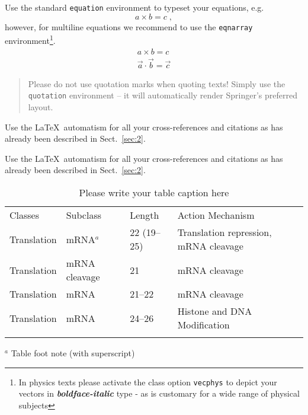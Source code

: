 \documentclass[graybox]{svmult}
\begin{document}
\newpage



Use the standard \verb|equation| environment to typeset your equations, e.g.
%
\begin{equation}
a \times b = c\;,
\end{equation}
%
however, for multiline equations we recommend to use the \verb|eqnarray| environment\footnote{In physics texts please activate the class option \texttt{vecphys} to depict your vectors in \textbf{\itshape boldface-italic} type - as is customary for a wide range of physical subjects}.
\begin{eqnarray}
a \times b = c \nonumber\\
\vec{a} \cdot \vec{b}=\vec{c}
\label{eq:01}
\end{eqnarray}


\begin{quotation}
Please do not use quotation marks when quoting texts! Simply use the \verb|quotation| environment -- it will automatically render Springer's preferred layout.
\end{quotation}









 Use the \LaTeX\ automatism for all your cross-references and citations as has already been described in Sect.~\ref{sec:2}.

 Use the \LaTeX\ automatism for all your cross-refer\-ences and citations as has already been described in Sect.~\ref{sec:2}.
%
%
\begin{table}
\caption{Please write your table caption here}
\label{tab:1}       %
%
%
\begin{tabular}{p{2cm}p{2.4cm}p{2cm}p{4.9cm}}
\hline\noalign{\smallskip}
Classes & Subclass & Length & Action Mechanism  \\
\noalign{\smallskip}\svhline\noalign{\smallskip}
Translation & mRNA$^a$  & 22 (19--25) & Translation repression, mRNA cleavage\\
Translation & mRNA cleavage & 21 & mRNA cleavage\\
Translation & mRNA  & 21--22 & mRNA cleavage\\
Translation & mRNA  & 24--26 & Histone and DNA Modification\\
\noalign{\smallskip}\hline\noalign{\smallskip}
\end{tabular}
$^a$ Table foot note (with superscript)
\end{table}
%
\end{document}
